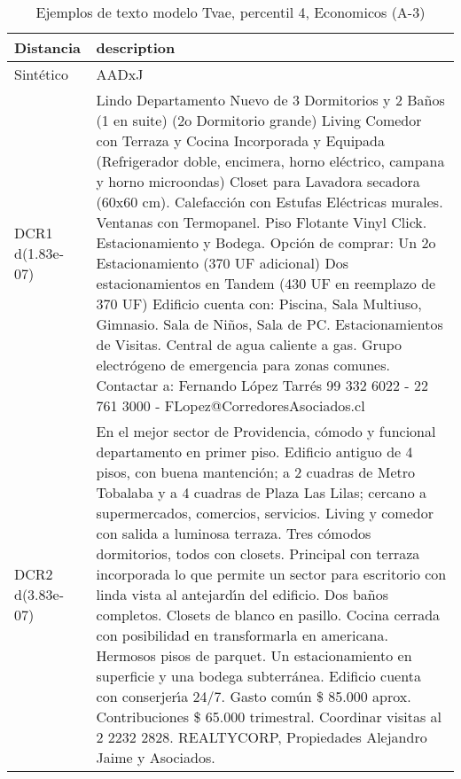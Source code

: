 \begin{table}[H]
\centering
\fontsize{10}{14}\selectfont
\caption{Ejemplos de texto modelo Tvae, percentil 4, Economicos (A-3)}
\label{table-example-economicos-a-3-tvae-4p-text}
\begin{tabular}{|l|m{35em}|}
\hline
\rowcolor[gray]{0.8}
Distancia & description \\
\hline Sintético & AADxJ \\
\hline DCR1 d(1.83e-07) & Lindo Departamento Nuevo de 3 Dormitorios y 2 Ba\~nos (1 en suite) (2o Dormitorio grande)  Living Comedor con Terraza y Cocina Incorporada y Equipada (Refrigerador doble, encimera, horno el\'ectrico, campana y horno microondas)  Closet para Lavadora secadora (60x60 cm). Calefacci\'on con Estufas El\'ectricas murales. Ventanas con Termopanel. Piso Flotante Vinyl Click.  Estacionamiento y Bodega. Opci\'on de comprar: Un 2o Estacionamiento (370 UF adicional) Dos estacionamientos en Tandem (430 UF en reemplazo de 370 UF)  Edificio cuenta con: Piscina, Sala Multiuso, Gimnasio. Sala de Ni\~nos, Sala de PC. Estacionamientos de Visitas. Central de agua caliente a gas. Grupo electr\'ogeno de emergencia para zonas comunes.  Contactar a: Fernando L\'opez Tarr\'es 99 332 6022 - 22 761 3000 - FLopez@CorredoresAsociados.cl \\
\hline DCR2 d(3.83e-07) & En el mejor sector de Providencia, c\'omodo y funcional departamento en primer piso. Edificio antiguo de 4 pisos, con buena mantenci\'on; a 2 cuadras de Metro Tobalaba y a 4 cuadras de Plaza Las Lilas; cercano a supermercados, comercios, servicios. Living y comedor con salida a luminosa terraza. Tres c\'omodos dormitorios, todos con closets. Principal con terraza incorporada lo que permite un sector para escritorio con linda vista al antejard{\'\i}n del edificio. Dos ba\~nos completos. Closets de blanco en pasillo. Cocina cerrada con posibilidad en transformarla en americana. Hermosos pisos de parquet. Un estacionamiento en superficie y una bodega subterr\'anea. Edificio cuenta con conserjer{\'\i}a 24/7. Gasto com\'un \$ 85.000 aprox. Contribuciones \$ 65.000 trimestral. Coordinar visitas al 2 2232 2828. REALTYCORP, Propiedades Alejandro Jaime y Asociados. \\
\hline
\end{tabular}
\end{table}
